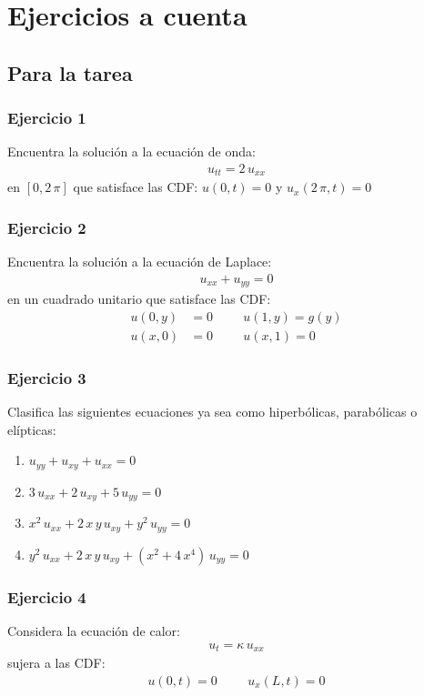 \documentclass[12pt]{beamer}
\begin{document}
\section{Ejercicios a cuenta}
\subsection{Para la tarea}

\begin{frame}
\frametitle{Ejercicio 1}
Encuentra la solución a la ecuación de onda:
\begin{align*}
  u_{tt} = 2 \, u_{xx} 
\end{align*}
en $[0, 2 \, \pi]$ que satisface las CDF: $u (0, t) = 0$ y $u_{x} (2 \, \pi, t) = 0$
\end{frame}
\begin{frame}
\frametitle{Ejercicio 2}
Encuentra la solución a la ecuación de Laplace:
\begin{align*}
  u_{xx} + u_{yy} = 0
\end{align*}
en un cuadrado unitario que satisface las CDF:
\begin{align*}
  u (0, y) &= 0 \hspace{1cm} u (1, y) = g (y) \\[0.5em]
  u (x, 0) &= 0  \hspace{1cm} u (x, 1) = 0
\end{align*}
\end{frame}
\begin{frame}
\frametitle{Ejercicio 3}
Clasifica las siguientes ecuaciones ya sea como hiperbólicas, parabólicas o elípticas:
\begin{enumerate}
\item $u_{yy} + u_{xy} + u_{xx} = 0$
\item $3 \, u_{xx} + 2 \, u_{xy} + 5 \, u_{yy} = 0$
\item $x^{2} \, u_{xx} + 2 \, x \, y \, u_{xy} + y^{2} \, u_{yy} = 0$
\item $y^{2} \, u_{xx} + 2 \, x \, y \, u_{xy} + \left( x^{2} + 4 \, x^{4} \right) \, u_{yy} = 0$
\end{enumerate}
\end{frame}
\begin{frame}
\frametitle{Ejercicio 4}
Considera la ecuación de calor:
\begin{align*}
  u_{t} = \kappa \, u_{xx}
\end{align*}
sujera a las CDF:
\begin{align*}
  u(0, t) = 0 \hspace{1cm} u_{x} (L, t) = 0
\end{align*}
\end{frame}
\end{document}
